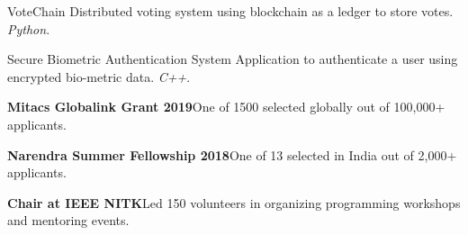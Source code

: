 \documentclass[10pt,letterpaper]{article}
\begin{document}
\headedsectiontwo
{VoteChain}{}{}
{
	Distributed voting system using blockchain as a ledger to store votes. \textit{Python}.
}

\headedsectiontwo
{Secure Biometric Authentication System}{}{}
{
	Application to authenticate a user using encrypted bio-metric data. \textit{C++}.
}


\begin{circlist}
	\item \textbf{Mitacs Globalink Grant 2019}\hspace{0.5em}One of 1500 selected globally out of 100,000+ applicants.
	\item \textbf{Narendra Summer Fellowship 2018}\hspace{0.5em}One of 13 selected in India out of 2,000+ applicants.
	\item \textbf{Chair at IEEE NITK}\hspace{0.5em}Led 150 volunteers in organizing programming workshops and mentoring events.
\end{circlist}

\end{document}
